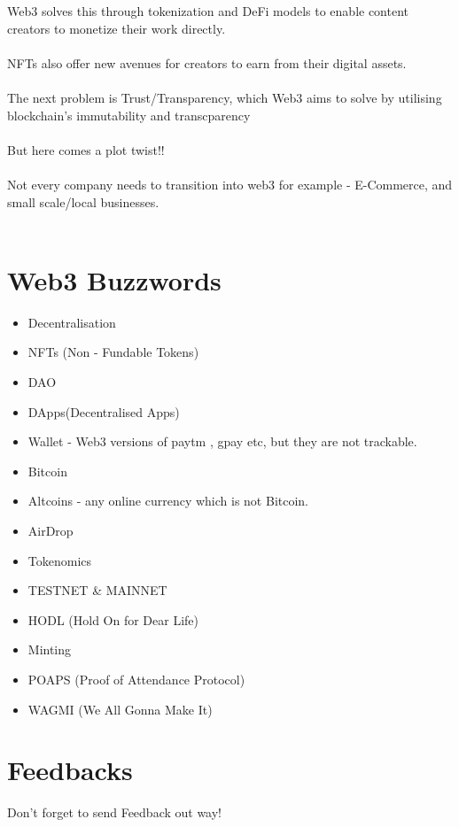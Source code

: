 \documentclass[a4paper,30pt]{report}
\begin{document}
          Web3 solves this through tokenization and DeFi models to enable content creators to monetize their work directly.\\\\
          NFTs also offer new avenues for creators to earn from their digital assets.\\\\

          The next problem is Trust/Transparency, which Web3 aims to solve by utilising blockchain's immutability and transcparency\\\\

          But here comes a plot twist!!\\\\

          Not every company needs to transition into web3 for example - E-Commerce, and small scale/local businesses.\\\\
        
      \section{Web3 Buzzwords}
        \begin{itemize}
          \item Decentralisation 
          \item NFTs (Non - Fundable Tokens)
          \item DAO
          \item DApps(Decentralised Apps)
          \item Wallet - Web3 versions of paytm , gpay etc, but they are not trackable.
          \item Bitcoin
          \item Altcoins - any online currency which is not Bitcoin.
          \item AirDrop
          \item Tokenomics
          \item TESTNET \& MAINNET
          \item HODL (Hold On for Dear Life)
          \item Minting
          \item POAPS (Proof of Attendance Protocol)
          \item WAGMI (We All Gonna Make It)

        \end{itemize}
      \section{Feedbacks} Don't forget to send Feedback out way!\\\\ 
\end{document}
